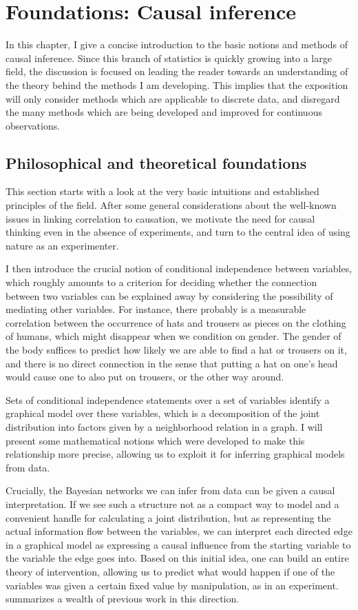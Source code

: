 \chapter{Foundations: Causal inference}\label{sec:3}
In this chapter, I give a concise introduction to the basic notions and methods of causal inference. Since this branch of statistics is quickly growing into a large field, the discussion is focused on leading the reader towards an understanding of the theory behind the methods I am developing. This implies that the exposition will only consider methods which are applicable to discrete data, and disregard the many methods which are being developed and improved for continuous observations.

\section{Philosophical and theoretical foundations}\label{sec:3:1}
This section starts with a look at the very basic intuitions and established principles of the field. After some general considerations about the well-known issues in linking correlation to causation, we motivate the need for causal thinking even in the absence of experiments, and turn to the central idea of using nature as an experimenter.

I then introduce the crucial notion of conditional independence between variables, which roughly amounts to a criterion for deciding whether the connection between two variables can be explained away by considering the possibility of mediating other variables. For instance, there probably is a measurable correlation between the occurrence of hats and trousers as pieces on the clothing of humans, which might disappear when we condition on gender. The gender of the body suffices to predict how likely we are able to find a hat or trousers on it, and there is no direct connection in the sense that putting a hat on one's head would cause one to also put on trousers, or the other way around.

Sets of conditional independence statements over a set of variables identify a graphical model over these variables, which is a decomposition of the joint distribution into factors given by a neighborhood relation in a graph. I will present some mathematical notions which were developed to make this relationship more precise, allowing us to exploit it for inferring graphical models from data.

Crucially, the Bayesian networks we can infer from data can be given a causal interpretation. If we see such a structure not as a compact way to model and a convenient handle for calculating a joint distribution, but as representing the actual information flow between the variables, we can interpret each directed edge in a graphical model as expressing a causal influence from the starting variable to the variable the edge goes into. Based on this initial idea, one can build an entire theory of intervention, allowing us to predict what would happen if one of the variables was given a certain fixed value by manipulation, as in an experiment. \cite{pearl2009} summarizes a wealth of previous work in this direction.

